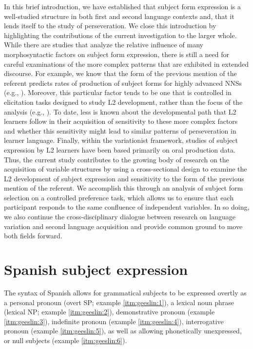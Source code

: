 \documentclass[output=paper]{langscibook}
\begin{document}
In this brief introduction, we have established that subject form expression is a well-studied structure in both first and second language contexts and, that it lends itself to the study of perseveration. We close this introduction by highlighting the contributions of the current investigation to the larger whole. While there are studies that analyze the relative influence of many morphosyntactic factors on subject form expression, there is still a need for careful examinations of the more complex patterns that are exhibited in extended discourse. For example, we know that the form of the previous mention of the referent predicts rates of production of subject forms for highly advanced NNSs (e.g., \citealt{GeeslinGudmestad2011}). Moreover, this particular factor tends to be one that is controlled in elicitation tasks designed to study L2 development, rather than the focus of the analysis (e.g., \citealt{GeeslinLinfordFafulas2015}). To date, less is known about the developmental path that L2 learners follow in their acquisition of sensitivity to these more complex factors and whether this sensitivity might lead to similar patterns of perseveration in learner language. Finally, within the variationist framework, studies of subject expression by L2 learners have been based primarily on oral production data. Thus, the current study contributes to the growing body of research on the acquisition of variable structures by using a cross-sectional design to examine the L2 development of subject expression and sensitivity to the form of the previous mention of the referent. We accomplish this through an analysis of subject form selection on a controlled preference task, which allows us to ensure that each participant responds to the same confluence of independent variables. In so doing, we also continue the cross-disciplinary dialogue between research on language variation and second language acquisition and provide common ground to move both fields forward.



\section{Spanish subject expression}\label{sec:geeslin:2}


The syntax of Spanish allows for grammatical subjects to be expressed overtly as a personal pronoun (overt SP; example \ref{itm:geeslin:1}), a lexical noun phrase (lexical NP; example \ref{itm:geeslin:2}), demonstrative pronoun (example \ref{itm:geeslin:3}), indefinite pronoun (example \ref{itm:geeslin:4}), interrogative pronoun (example \ref{itm:geeslin:5}), as well as allowing phonetically unexpressed, or null subjects (example \ref{itm:geeslin:6}).
\end{document}
